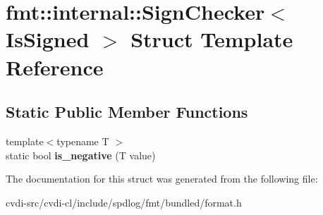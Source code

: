 \hypertarget{structfmt_1_1internal_1_1SignChecker}{}\section{fmt\+:\+:internal\+:\+:Sign\+Checker$<$ Is\+Signed $>$ Struct Template Reference}
\label{structfmt_1_1internal_1_1SignChecker}
\subsection*{Static Public Member Functions}
\begin{DoxyCompactItemize}
\item 
{\footnotesize template$<$typename T $>$ }\\static bool {\bfseries is\+\_\+negative} (T value)\hypertarget{structfmt_1_1internal_1_1SignChecker_ae60ea5795026fd1d83b34ec79d145baf}{}\label{structfmt_1_1internal_1_1SignChecker_ae60ea5795026fd1d83b34ec79d145baf}

\end{DoxyCompactItemize}


The documentation for this struct was generated from the following file\+:\begin{DoxyCompactItemize}
\item 
cvdi-\/src/cvdi-\/cl/include/spdlog/fmt/bundled/format.\+h\end{DoxyCompactItemize}
